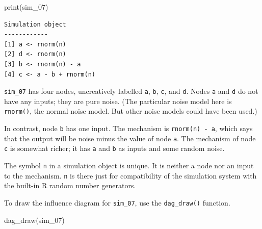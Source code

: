 \documentclass[
  letterpaper,
  DIV=11,
  numbers=noendperiod,
  oneside]{scrartcl}
\newenvironment{Shaded}{\begin{snugshade}}{\end{snugshade}}
\newcommand{\FunctionTok}[1]{\textcolor[rgb]{0.28,0.35,0.67}{#1}}
\newcommand{\NormalTok}[1]{\textcolor[rgb]{0.00,0.23,0.31}{#1}}
\begin{document}
\begin{Shaded}
\begin{Highlighting}[]
\FunctionTok{print}\NormalTok{(sim\_07) }
\end{Highlighting}
\end{Shaded}

\begin{verbatim}
Simulation object
------------
[1] a <- rnorm(n)
[2] d <- rnorm(n)
[3] b <- rnorm(n) - a
[4] c <- a - b + rnorm(n)
\end{verbatim}

\texttt{sim\_07} has four nodes, uncreatively labelled \texttt{a},
\texttt{b}, \texttt{c}, and \texttt{d}. Nodes \texttt{a} and \texttt{d}
do not have any inputs; they are pure noise. (The particular noise model
here is \texttt{rnorm()}, the normal noise model. But other noise models
could have been used.)

In contrast, node \texttt{b} has one input. The mechanism is
\texttt{rnorm(n)\ -\ a}, which says that the output will be noise minus
the value of node \texttt{a}. The mechanism of node \texttt{c} is
somewhat richer; it has \texttt{a} and \texttt{b} as inputs and some
random noise.

The symbol \texttt{n} in a simulation object is unique. It is neither a
node nor an input to the mechanism. \texttt{n} is there just for
compatibility of the simulation system with the built-in R random number
generators.

To draw the influence diagram for \texttt{sim\_07}, use the
\texttt{dag\_draw()} function.

\begin{Shaded}
\begin{Highlighting}[]
\FunctionTok{dag\_draw}\NormalTok{(sim\_07)}
\end{Highlighting}
\end{Shaded}
\end{document}
